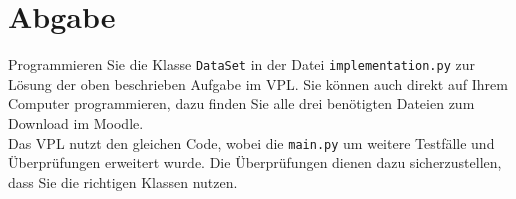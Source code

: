 \documentclass[]{article}
\begin{document}
\section{Abgabe}

Programmieren Sie die Klasse \texttt{DataSet} in der Datei \texttt{implementation.py} zur Lösung der oben beschrieben Aufgabe im VPL. Sie können auch direkt auf Ihrem Computer programmieren, dazu finden Sie alle drei benötigten Dateien zum Download im Moodle.\\
\newline
Das VPL nutzt den gleichen Code, wobei die \texttt{main.py} um weitere Testfälle und Überprüfungen erweitert wurde. Die Überprüfungen dienen dazu sicherzustellen, dass Sie die richtigen Klassen nutzen.\\
\end{document}
